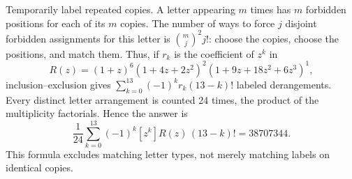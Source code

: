 Temporarily label repeated copies. A letter appearing $m$ times has $m$ forbidden positions for each of its $m$ copies. The number of ways to force $j$ disjoint forbidden assignments for this letter is $\binom mj^2j!$: choose the copies, choose the positions, and match them.
Thus, if $r_k$ is the coefficient of $z^k$ in
\[
R(z)=(1+z)^{6}(1+4z+2z^2)^{2}(1+9z+18z^2+6z^3)^{1},
\]
inclusion--exclusion gives $\sum_{k=0}^{13}(-1)^kr_k(13-k)!$ labeled derangements. Every distinct letter arrangement is counted 24 times, the product of the multiplicity factorials. Hence the answer is
\[
\boxed{\dfrac{1}{24}\sum_{k=0}^{13}(-1)^k[z^k]R(z)\,(13-k)!=38707344}.
\]
This formula excludes matching letter types, not merely matching labels on identical copies.

